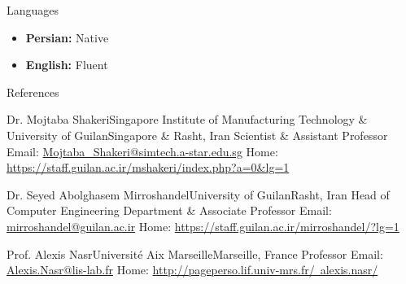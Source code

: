 \documentclass[]{mcdowellcv}
\begin{document}
    \begin{cvsection}{Languages}
    	\begin{cvsubsection}{}{}{}
    	
    	\begin{itemize}
    	    \item \textbf{Persian:} Native
    	    \item \textbf{English:} Fluent
	    \end{itemize}
	    
    	\end{cvsubsection}
    \end{cvsection}
    

	 \begin{cvsection}{References}
	 
 		\begin{cvsubsection}{Dr. Mojtaba Shakeri}{Singapore Institute of Manufacturing Technology \& University of Guilan}{Singapore \& Rasht, Iran}
		    Scientist \& Assistant Professor \newline
			Email: \href{mailto:Mojtaba\_Shakeri@simtech.a-star.edu.sg}{Mojtaba\_Shakeri@simtech.a-star.edu.sg} \newline
			Home: \href{https://staff.guilan.ac.ir/mshakeri/index.php?a=0\&lg=1}{https://staff.guilan.ac.ir/mshakeri/index.php?a=0\&lg=1}
    	\end{cvsubsection}
		\begin{cvsubsection}{Dr. Seyed Abolghasem Mirroshandel}{University of Guilan}{Rasht, Iran}
		    Head of Computer Engineering Department \& Associate Professor \newline
			Email: \href{mailto:mirroshandel@guilan.ac.ir}{mirroshandel@guilan.ac.ir} \newline
			Home: \href{https://staff.guilan.ac.ir/mirroshandel/?lg=1}{https://staff.guilan.ac.ir/mirroshandel/?lg=1}

    	\end{cvsubsection}
    	
		\begin{cvsubsection}{Prof. Alexis Nasr}{Université Aix Marseille}{Marseille, France}
		    Professor \newline
			Email: \href{mailto:Alexis.Nasr@lis-lab.fr}{Alexis.Nasr@lis-lab.fr} \newline
			Home: \href{http://pageperso.lif.univ-mrs.fr/~alexis.nasr/}{http://pageperso.lif.univ-mrs.fr/~alexis.nasr/}
    	\end{cvsubsection}
    	


    \end{cvsection}
	
\end{document}
